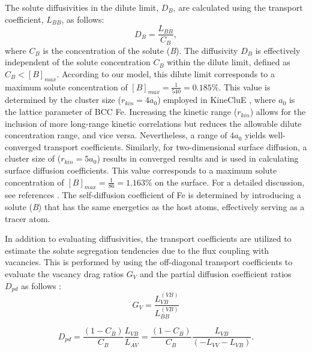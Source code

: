 \documentclass[preprint,12pt]{elsarticle}
\begin{document}
The solute diffusivities in the dilute limit, $D_B$, are calculated using the transport coefficient, $L_{BB}$, as follows:
\begin{equation}
\label{eq_solute_diffusivity}
    D_B = \frac{L_{BB}}{C_B},
\end{equation}
where $C_B$ is the concentration of the solute (\textit{B}).  The diffusivity \( D_B \) is effectively independent of the solute concentration \( C_B \) within the dilute limit, defined as $C_B < [B]_{max}$. According to our model, this dilute limit corresponds to a maximum solute concentration of $[B]_{max} = \frac{1}{540} = 0.185\%$. This value is determined by the cluster size ($r_{kin} = 4 a_0$) employed in KineCluE \cite{schuler_kineclue_2020}, where \( a_0 \) is the lattice parameter of BCC Fe. Increasing the kinetic range ($r_{kin}$) allows for the inclusion of more long-range kinetic correlations but reduces the allowable dilute concentration range, and vice versa. Nevertheless, a range of \( 4a_0 \) yields well-converged transport coefficients. Similarly, for two-dimensional surface diffusion, a cluster size of ($r_{kin} = 5 a_0$) results in converged results and is used in calculating surface diffusion coefficients. This value corresponds to a maximum solute concentration of $[B]_{max} = \frac{1}{86} = 1.163\%$ on the surface. For a detailed discussion, see references \cite{shousha2024first, shousha_vacancy-mediated_2024, messina_solute_2020}.
The self-diffusion coefficient of Fe is determined by introducing a solute (\textit{B}) that has the same energetics as the host atoms, effectively serving as a tracer atom.

In addition to evaluating diffusivities, the transport coefficients are utilized to estimate the solute segregation tendencies due to the flux coupling with vacancies. This is performed by using the off-diagonal transport coefficients to evaluate the vacancy drag ratios $G_V$ and the partial diffusion coefficient ratios $D_{pd}$ as follows \cite{messina_exact_2014, messina_solute_2020}:
\begin{equation}
\label{eq:drag}
    G_V = \frac{L_{VB}^{(VB)}}{L_{BB}^{(VB)}}
\end{equation}

\begin{equation}
\label{eq:pdc}
D_{pd} = \frac{(1-C_B)}{C_B} \frac{L_{VB}}{L_{AV}} = \frac{(1-C_B)}{C_B} \frac{L_{VB}}{(-L_{VV}-L_{VB})}.
\end{equation}
\end{document}
